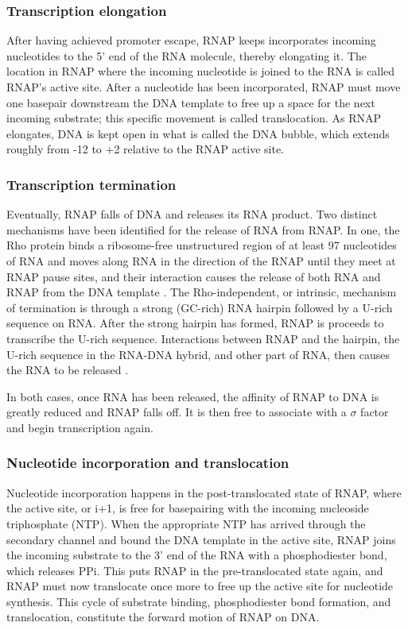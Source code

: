 \subsubsection{Transcription elongation}
After having achieved promoter escape, RNAP keeps incorporates incoming
nucleotides to the 5' end of the RNA molecule, thereby elongating it. The
location in RNAP where the incoming nucleotide is joined to the RNA is
called RNAP's active site. After a nucleotide has been incorporated, RNAP must
move one basepair downstream the DNA template to free up a space for the next
incoming substrate; this specific movement is called translocation. As RNAP
elongates, DNA is kept open in what is called the DNA bubble, which extends
roughly from -12 to +2 relative to the RNAP active site.

\subsubsection{Transcription termination}
Eventually, RNAP falls of DNA and releases its RNA product. Two distinct
mechanisms have been identified for the release of RNA from RNAP. In one, the Rho
protein binds a ribosome-free unstructured region of at least 97 nucleotides of
RNA and moves along RNA in the direction of the RNAP until they meet at RNAP
pause sites, and their interaction causes the release of both RNA and RNAP from
the DNA template \cite{ciampi_rho-dependent_2006}. The
Rho-independent, or intrinsic, mechanism of termination is through a strong
(GC-rich) RNA hairpin followed by a U-rich sequence on RNA. After the strong
hairpin has formed, RNAP is proceeds to transcribe the U-rich sequence.
Interactions between RNAP and the hairpin, the U-rich sequence in the RNA-DNA
hybrid, and other part of RNA, then causes the RNA to be released
\cite{nudler_transcription_2002}.

In both cases, once RNA has been released, the affinity of RNAP to DNA is
greatly reduced and RNAP falls off. It is then free to associate with a
$\sigma$ factor and begin transcription again.

\subsubsection{Nucleotide incorporation and translocation}
Nucleotide incorporation happens in the post-translocated state of RNAP, where
the active site, or i+1, is free for basepairing with the incoming nucleoside
triphosphate (NTP). When the appropriate NTP has arrived through the secondary
channel and bound the DNA template in the active site, RNAP joins the incoming
substrate to the 3' end of the RNA with a phosphodiester bond, which releases
PPi. This puts RNAP in the pre-translocated state again, and RNAP must now
translocate once more to free up the active site for nucleotide synthesis. This
cycle of substrate binding, phosphodiester bond formation, and translocation,
constitute the forward motion of RNAP on DNA.

